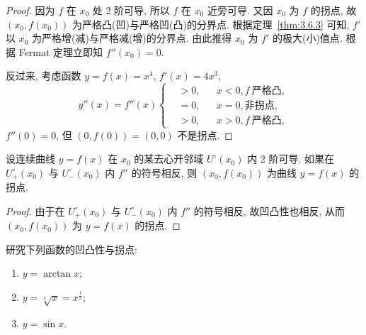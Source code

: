 \begin{proof}
因为 $f$ 在 $x_{0}$ 处 2 阶可导, 所以 $f$ 在 $x_{0}$ 近旁可导. 又因 $x_{0}$ 为 $f$ 的拐点, 故 $(x_{0},f(x_{0}))$ 为严格凸(凹)与严格凹(凸)的分界点. 根据定理~\ref{thm:3.6.3} 可知, $f'$ 以 $x_{0}$ 为严格增(减)与严格减(增)的分界点. 由此推得 $x_{0}$ 为 $f'$ 的极大(小)值点. 根据 Fermat 定理立即知 $f''(x_{0})=0$.

反过来, 考虑函数 $y=f(x)=x^{4}$, $f'(x)=4x^{3}$,
\[
y''(x)=f''(x)\left\{
\begin{aligned}
&>0, &&x<0, f\ \text{严格凸},\\
&=0, &&x=0, \text{非拐点},\\
&>0, &&x>0, f\ \text{严格凸},
\end{aligned}\right.
\]
$f''(0)=0$, 但 $(0,f(0))=(0,0)$ 不是拐点.
\end{proof}

\begin{theorem}\label{thm:3.6.6}
设连续曲线 $y=f(x)$ 在 $x_{0}$ 的某去心开邻域 $U^{\circ}(x_{0})$ 内 2 阶可导. 如果在 $U_{+}^{\circ}(x_{0})$ 与 $U_{-}^{\circ}(x_{0})$ 内 $f''$ 的符号相反, 则 $(x_{0},f(x_{0}))$ 为曲线 $y=f(x)$ 的拐点.
\end{theorem}

\begin{proof}
由于在 $U_{+}^{\circ}(x_{0})$ 与 $U_{-}^{\circ}(x_{0})$ 内 $f''$ 的符号相反, 故凹凸性也相反, 从而 $(x_{0},f(x_{0}))$ 为 $y=f(x)$ 的拐点.
\end{proof}

\begin{example}\label{ex:3.6.1}
研究下列函数的凹凸性与拐点:
\begin{enumerate}[label=(\arabic*)]
  \item $y=\arctan x$;
  \item $y=\sqrt[3]{x}=x^{\frac{1}{3}}$;
  \item $y=\sin x$.
\end{enumerate}
\end{example}

